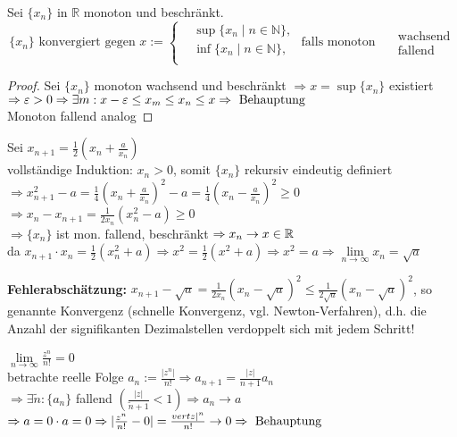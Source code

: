 \begin{proposition}
	Sei $\{x_n\}$ in $\mathbb{R}$ monoton und beschränkt.\[
	\{x_n\}\text{ konvergiert gegen }x:=
	\left\lbrace
		\begin{aligned}
			&\sup \{x_n \mid n\in\mathbb{N}\}, \\
			&\inf\{x_n \mid n\in\mathbb{N}\}, \\
		\end{aligned}
	\right.
	\text{ falls monoton }\;
	\begin{aligned}
		&\text{wachsend}\\
		&\text{fallend}
	\end{aligned}
	\]
\end{proposition}
\begin{proof}
	Sei $\{x_n\}$ monoton wachsend und beschränkt $\Rightarrow x=\sup\{x_n\}$ existiert $\Rightarrow \varepsilon>0\Rightarrow \exists m:x-\varepsilon\le x_m\le x_n\le x\Rightarrow \text{ Behauptung}$ \\
	Monoton fallend analog
\end{proof}

\begin{example}
	Sei $x_{n+1}=\frac{1}{2}(x_n+\frac{a}{x_n})$ \\
	vollständige Induktion: $x_n>0$, somit $\{x_n\}$ rekursiv eindeutig definiert \\
	$\Rightarrow x_{n+1}^2-a=\frac{1}{4}(x_n+\frac{a}{x_n})^2-a=\frac{1}{4}(x_n-\frac{a}{x_n})^2\ge 0$\\
	$\Rightarrow x_n-x_{n+1}=\frac{1}{2x_n}(x_n^2-a)\ge 0$ \\
	$\Rightarrow \{x_n\}$ ist mon. fallend, beschränkt $\Rightarrow x_n\to x\in\mathbb{R}$ \\
	da $x_{n+1}\cdot x_n=\frac{1}{2}(x_n^2+a)\Rightarrow x^2=\frac{1}{2}(x^2+a)\Rightarrow x^2=a\Rightarrow \lim\limits_{n\to\infty} x_n=\sqrt{a}$
	
	\textbf{Fehlerabschätzung:} $x_{n+1}-\sqrt{a}=\frac{1}{2x_n}(x_n-\sqrt{a})^2\le \frac{1}{2\sqrt{a}}(x_n-\sqrt{a})^2$, so genannte  Konvergenz (schnelle Konvergenz, vgl. Newton-Verfahren), d.h. die Anzahl der signifikanten Dezimalstellen verdoppelt sich mit jedem Schritt!
\end{example}

\begin{example}
	$\lim\limits_{n\to\infty} \frac{z^n}{n!}=0$ \\
	betrachte reelle Folge $a_n:=\frac{\vert z^n\vert}{n!}\Rightarrow a_{n+1}=\frac{\vert z\vert}{n+1}a_n$ \\
	$\Rightarrow\exists\tilde{n}:\{a_n\}$ fallend $\left( \frac{\vert z\vert}{\tilde{n}+1}<1\right)\Rightarrow a_n\to a$ \\
	$\Rightarrow a=0\cdot a=0\Rightarrow \vert \frac{z^n}{n!}-0\vert=\frac{vert z\vert^n}{n!}\to 0\Rightarrow \text{ Behauptung}$
\end{example}

